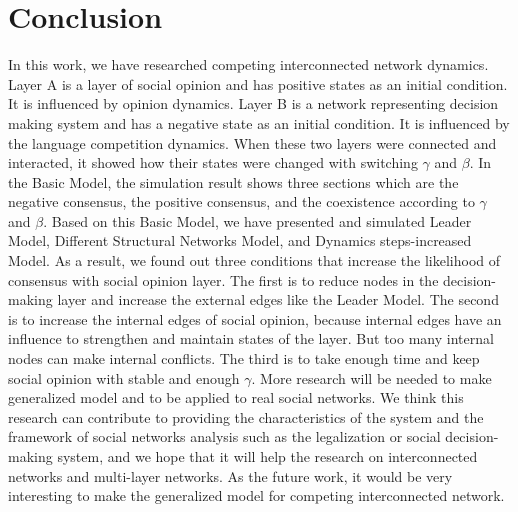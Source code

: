 \documentclass[english]{cccconf}
\begin{document}
\section{Conclusion}
In this work, we have researched competing interconnected network dynamics. Layer A is a layer of social opinion and has positive states as an initial condition. It is influenced by opinion dynamics. Layer B is a network representing decision making system and has a negative state as an initial condition. It is influenced by the language competition dynamics. When these two layers were connected and interacted, it showed how their states were changed with switching $\gamma$ and $\beta$. In the Basic Model, the simulation result shows three sections which are the negative consensus, the positive consensus, and the coexistence according to $\gamma$ and $\beta$. Based on this Basic Model, we have presented and simulated Leader Model, Different Structural Networks Model, and Dynamics steps-increased Model. As a result, we found out three conditions that increase the likelihood of consensus with social opinion layer. The first is to reduce nodes in the decision-making layer and increase the external edges like the Leader Model. The second is to increase the internal edges of social opinion, because internal edges have an influence to strengthen and maintain states of the layer. But too many internal nodes can make internal conflicts. The third is to take enough time and keep social opinion with stable and enough $\gamma$. More research will be needed to make generalized model and to be applied to real social networks. We think this research can contribute to providing the characteristics of the system and the framework of social networks analysis such as the legalization or social decision-making system, and we hope that it will help the research on interconnected networks and multi-layer networks. As the future work, it would be very interesting to make the generalized model for competing interconnected network.
\end{document}
